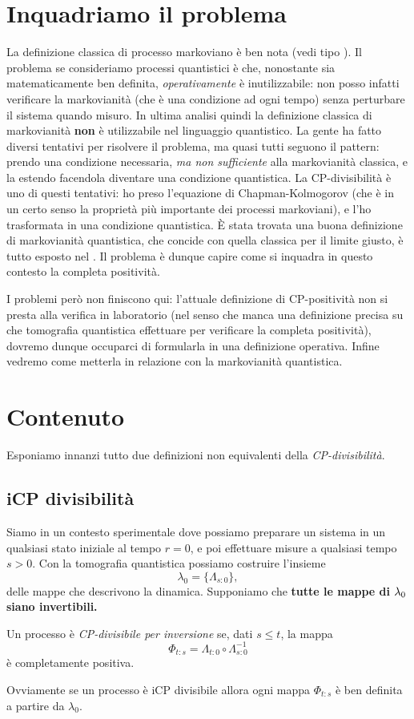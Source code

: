 \documentclass[a4]{article}
\begin{document}
\section{Inquadriamo il problema}
La definizione classica di processo markoviano è ben nota (vedi tipo \cite{breuer2007theory, markovcondition}).
Il problema se consideriamo processi quantistici è che, nonostante sia matematicamente
ben definita, \emph{operativamente} è inutilizzabile: non posso infatti verificare
la markovianità (che è una condizione ad  ogni tempo) senza perturbare il sistema
quando misuro. In ultima analisi quindi  la definizione classica di markovianità
\textbf{non} è utilizzabile nel linguaggio quantistico.
La gente ha fatto diversi tentativi per risolvere il problema, ma quasi tutti seguono
il pattern: prendo una condizione necessaria, \emph{ma non sufficiente} alla markovianità
classica, e la estendo facendola diventare una condizione quantistica. La CP-divisibilità
è uno di questi tentativi: ho preso l'equazione di Chapman-Kolmogorov (che è in un certo
senso la proprietà più importante dei processi markoviani), e l'ho trasformata in una
condizione  quantistica.
È stata  trovata una buona definizione di markovianità quantistica, che concide con
quella classica per il limite giusto, è tutto esposto nel \cite{markovcondition}.
Il problema è dunque capire come si inquadra in questo  contesto la completa positività.

I problemi però non finiscono qui: l'attuale definizione di CP-positività non si presta alla
verifica in laboratorio  (nel senso  che manca una definizione precisa su che tomografia
quantistica effettuare per verificare la completa positività), dovremo dunque occuparci
di formularla in una definizione operativa.
Infine vedremo come metterla in relazione con la markovianità quantistica.

\section{Contenuto}
Esponiamo innanzi tutto due definizioni non equivalenti della \emph{CP-divisibilità}.

\subsection{iCP divisibilità}
Siamo in un contesto sperimentale dove possiamo preparare un sistema in un qualsiasi
stato iniziale al tempo \(r=0\), e poi effettuare misure a qualsiasi tempo \(s>0\).
Con la tomografia  quantistica  possiamo costruire  l'insieme
\[  \lambda_0 = \{\Lambda_{s\colon0}\}, \]
delle mappe che descrivono la dinamica. Supponiamo che \textbf{tutte le mappe di
\(\boldmath{\lambda_0}\) siano invertibili.}
\begin{defn}
Un processo è \emph{CP-divisibile per inversione} se, dati \(s \le  t\), la mappa
\[\Phi_{t\colon s} = \Lambda_{t\colon0} \circ \Lambda^{-1}_{s\colon0}\]
è completamente positiva.
\end{defn}
Ovviamente se un processo è iCP divisibile allora ogni mappa \(\Phi_{t\colon s}\) è ben definita
a partire da \(\lambda_0\).
\end{document}
